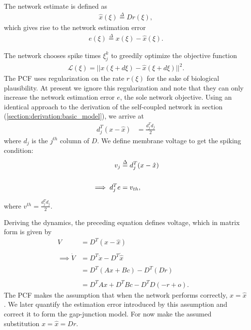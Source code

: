 \begin{enumerate}
\begin{itemize}
The network estimate is defined as 
\begin{align}
\label{eq:analysis:comparison_sc_vs_pcf_vs_gj:pcf_xhat_def}
\hat{x}(\xi) \overset{\Delta}{=} D r(\xi),
\end{align}
which gives rise to the network estimation error
\begin{align}
\label{eq:analysis:comparison_sc_vs_pcf_vs_gj:pcf_error_def}
e(\xi) \overset{\Delta}{=} x(\xi) - \hat{x}(\xi).
\end{align}

The network chooses spike times $\xi_j^k$ to greedily optimize the objective function
\begin{align*}
\mathcal{L}(\xi) = ||x(\xi + d\xi) - \hat{x}(\xi + d\xi)||^2.
\end{align*}
The PCF uses regularization on the rate $r(\xi)$ for the sake of biological plausibility. At present we ignore this regularization and note that they can only increase the network estimation error $e$, the sole network objective.
Using an identical approach to the derivation of the self-coupled network in section (\ref{section:derivation:basic_model}), we arrive at 
\begin{align*}
d_j^T 
\left(
	x - \hat{x}
\right)
&= 
\frac{d_j^T d_j}{2}
\end{align*}
where $d_j$ is the $j^{th}$ column of $D$. We define membrane voltage to get the spiking condition:
\begin{align}
\label{eq:analysis:comparison_sc_vs_pcf_vs_gj:pcf_voltage_def}
v_j &\overset{\Delta}{=} d_j^T (x - \hat{x}) 
\notag
\\
\\
\notag
\implies
d_j^T e &= v_{th}, 
\end{align}

where $v^{th} = \frac{d_j^T d_j}{2}$.

Deriving the dynamics, the preceding equation defines voltage, which in matrix form is given by
\begin{align*}
V &= D^T 
\left(
	x - \hat{x}
\right)
%
\\
\\
%
\implies
\dot{V}
&= 
D^T \dot{x} - D^T \dot{\hat{x}}
&
\\
\\
%
&= D^T 
\left(
	A x + B c
\right)
 - D^T 
 \left(
 D \dot{r}
 \right)
 \\
 \\
 &= 
 D^T A x
 + D^T B c
 - D^T D
\left(
	-r + o 
\right) 
 .
\end{align*}
The PCF makes the assumption that when the network performs correctly, $x = \hat{x}$. We later quantify the estimation error introduced by this assumption and correct it to form the gap-junction model. For now make the assumed substitution $x = \hat{x} = Dr$. 


\end{itemize}
\end{enumerate}
